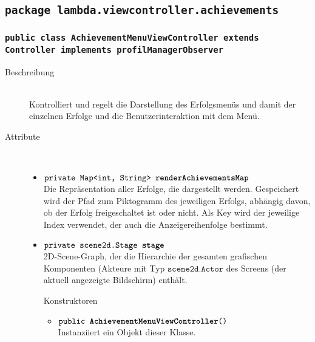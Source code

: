 \subsection{\texttt{package lambda.viewcontroller.achievements}}

\subsubsection{\normalfont \texttt{public class \textbf{AchievementMenuViewController} extends Controller implements profilManagerObserver}}

\begin{description}
\item[Beschreibung] \hfill \\ Kontrolliert und regelt die Darstellung des Erfolgsmenüs und damit der einzelnen Erfolge und die Benutzerinteraktion mit dem Menü.
\item[Attribute] \hfill \\
	\vspace{-.8cm}
	\begin{itemize}
		\item $\texttt{private Map<int, String> \textbf{renderAchievementsMap}}$ \\ Die Repräsentation aller Erfolge, die dargestellt werden. Gespeichert wird der Pfad zum Piktogramm des jeweiligen Erfolgs, abhängig davon, ob der Erfolg freigeschaltet ist oder nicht. Als Key wird der jeweilige Index verwendet, der auch die Anzeigereihenfolge bestimmt.
		\item $\texttt{private scene2d.Stage \textbf{stage}}$ \\ 2D-Scene-Graph, der die Hierarchie der gesamten grafischen Komponenten (Akteure mit Typ $\texttt{scene2d.Actor}$ des Screens (der aktuell angezeigte Bildschirm) enthält. 
	
\item[Konstruktoren] \hfill \\
	\vspace{-.8cm}
	\begin{itemize}
		\item $\texttt{public \textbf{AchievementMenuViewController}()}$ \\ Instanziiert ein Objekt dieser Klasse.
	\end{itemize}
	

\end{itemize}
\end{description}
